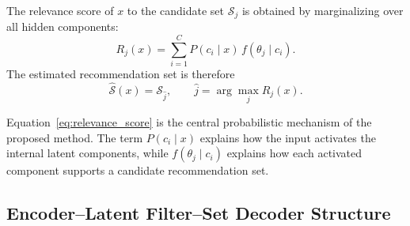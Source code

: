 \documentclass{article}
\theoremstyle{plain}
\theoremstyle{definition}
\theoremstyle{remark}
\begin{document}
The relevance score of \(x\) to the candidate set \(\mathcal S_j\) is obtained by marginalizing over all hidden components:
\begin{equation}
	\label{eq:relevance_score}
	R_j(x)
	=
	\sum_{i=1}^{C}
	P(c_i\mid x)\,
	f(\theta_j\mid c_i).
\end{equation}
The estimated recommendation set is therefore
\begin{equation}
	\label{eq:estimated_set}
	\widehat{\mathcal S}(x)
	=
	\mathcal S_{\widehat j},
	\qquad
	\widehat j
	=
	\arg\max_{j}
	R_j(x).
\end{equation}

Equation~\eqref{eq:relevance_score} is the central probabilistic mechanism of the proposed method. The term \(P(c_i\mid x)\) explains how the input activates the internal latent components, while \(f(\theta_j\mid c_i)\) explains how each activated component supports a candidate recommendation set.

\subsection{Encoder--Latent Filter--Set Decoder Structure}
\label{subsec:tikz_structure}
\end{document}
